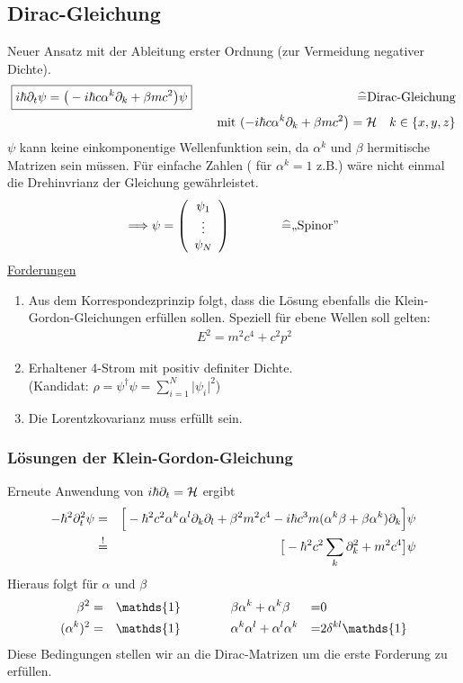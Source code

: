 \subsection{Dirac-Gleichung}
Neuer Ansatz mit der Ableitung erster Ordnung (zur Vermeidung negativer Dichte).
\begin{eqnarray*} 
	\boxed{i \hbar \partial_ t \psi = \big ( - i\hbar c \alpha^k \partial_k + \beta m c^2\big) \psi} \quad &{}& \widehat = \text{Dirac-Gleichung}\\ &{}&\text{mit }( - i\hbar c \alpha^k \partial_k + \beta m c^2\big) = \mathcal H \quad k\in\{x,y,z\}
\end{eqnarray*}
$\psi$ kann keine einkomponentige Wellenfunktion sein, da $\alpha^k$ und $\beta $ hermitische Matrizen sein müssen. Für einfache Zahlen ( für $\alpha^k = 1 $ z.B.) wäre nicht einmal die Drehinvrianz der Gleichung gewährleistet.
\begin{eqnarray*} \Longrightarrow \psi = \left ( \begin{array}{c} \psi_1 \\ \vdots \\ \psi_N \end{array} \right )\qquad \qquad \widehat = \text{,,Spinor''} \end{eqnarray*}
\underline{Forderungen}
\begin{enumerate}
\item Aus dem Korrespondezprinzip folgt, dass die Lösung ebenfalls die Klein-Gordon-Gleichungen erfüllen sollen. Speziell für ebene Wellen soll gelten:
\begin{eqnarray*} E^2 = m^2 c^4 + c^2p^2 \end{eqnarray*}

\item Erhaltener 4-Strom mit positiv definiter Dichte.\\
(Kandidat: $\rho = \psi^\dagger \psi= \sum \limits_{i =1}^{N} \big|\psi_i\big|^2$)
\item Die Lorentzkovarianz muss erfüllt sein.
\end{enumerate}

\subsubsection{Lösungen der Klein-Gordon-Gleichung}
Erneute Anwendung von $i\hbar \partial_t = \mathcal H$ ergibt
\begin{eqnarray*}
-\hbar^2\partial_t ^2\psi &=& \Big [ - \hbar ^2c^2\alpha^k\alpha ^l \partial_k\partial_l + \beta^2m^2c^4 - i \hbar c^3 m (\alpha^k\beta + \beta\alpha^k) \partial_k \Big ]\psi\\
&\overset! = & \big[-\hbar^2c ^2\sum\limits_k \partial_k^2 + m^2c^4\big ] \psi
\end{eqnarray*}
Hieraus folgt für $\alpha$ und $\beta$
\begin{alignat}{4}
\beta^2 \g \mathds{1} \qquad \qquad &\beta\alpha^k + \alpha^k \beta \g 0\\
(\alpha^k)^2 \g \mathds{1} \qquad\qquad& \alpha^k\alpha^l + \alpha^l\alpha^k \g 2 \delta^{kl} \mathds {1}
\end{alignat}
Diese Bedingungen stellen wir an die Dirac-Matrizen um die erste Forderung zu erfüllen.

